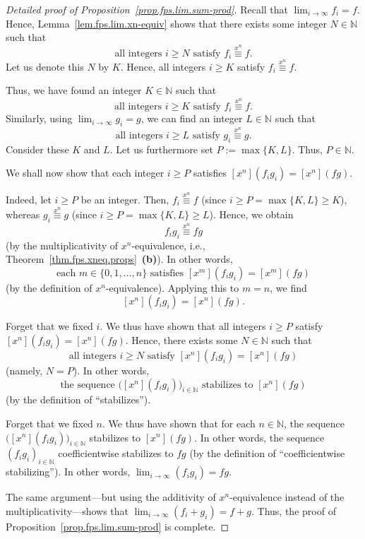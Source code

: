 \begin{proof}[Detailed proof of Proposition~\ref{prop.fps.lim.sum-prod}]
\leanok
Recall that $\lim_{i\to\infty} f_i = f$.
Hence, Lemma~\ref{lem.fps.lim.xn-equiv} shows that there exists some
integer $N\in\mathbb{N}$ such that
\[
\text{all integers } i\geq N \text{ satisfy }
f_i \overset{x^n}{\equiv} f.
\]
Let us denote this $N$ by $K$. Hence, all integers $i\geq K$ satisfy
$f_i \overset{x^n}{\equiv} f$.

Thus, we have found an integer $K\in\mathbb{N}$ such that
\[
\text{all integers } i\geq K \text{ satisfy }
f_i \overset{x^n}{\equiv} f.
\]
Similarly, using $\lim_{i\to\infty} g_i = g$, we can find an integer
$L\in\mathbb{N}$ such that
\[
\text{all integers } i\geq L \text{ satisfy }
g_i \overset{x^n}{\equiv} g.
\]
Consider these $K$ and $L$. Let us furthermore set
$P := \max\{K, L\}$. Thus, $P\in\mathbb{N}$.

We shall now show that each integer $i\geq P$ satisfies
$[x^n](f_i g_i) = [x^n](fg)$.

Indeed, let $i\geq P$ be an integer. Then, $f_i \overset{x^n}{\equiv} f$
(since $i\geq P = \max\{K, L\} \geq K$), whereas
$g_i \overset{x^n}{\equiv} g$
(since $i\geq P = \max\{K, L\} \geq L$). Hence, we obtain
\[
f_i g_i \overset{x^n}{\equiv} fg
\]
(by the multiplicativity of $x^n$-equivalence, i.e., Theorem~\ref{thm.fps.xneq.props}~\textbf{(b)}). In other words,
\[
\text{each } m\in\{0,1,\ldots,n\} \text{ satisfies }
[x^m](f_i g_i) = [x^m](fg)
\]
(by the definition of $x^n$-equivalence). Applying this to $m = n$,
we find
\[
[x^n](f_i g_i) = [x^n](fg).
\]

Forget that we fixed $i$. We thus have shown that all integers $i\geq P$
satisfy $[x^n](f_i g_i) = [x^n](fg)$. Hence, there exists some
$N\in\mathbb{N}$ such that
\[
\text{all integers } i\geq N \text{ satisfy }
[x^n](f_i g_i) = [x^n](fg)
\]
(namely, $N = P$). In other words,
\[
\text{the sequence } \bigl([x^n](f_i g_i)\bigr)_{i\in\mathbb{N}}
\text{ stabilizes to } [x^n](fg)
\]
(by the definition of ``stabilizes'').

Forget that we fixed $n$. We thus have shown that for each
$n\in\mathbb{N}$, the sequence $\bigl([x^n](f_i g_i)\bigr)_{i\in\mathbb{N}}$
stabilizes to $[x^n](fg)$. In other words, the sequence
$(f_i g_i)_{i\in\mathbb{N}}$ coefficientwise stabilizes to $fg$
(by the definition of ``coefficientwise stabilizing''). In other words,
$\lim_{i\to\infty}(f_i g_i) = fg$.

The same argument---but using the additivity of $x^n$-equivalence instead
of the multiplicativity---shows that
$\lim_{i\to\infty}(f_i + g_i) = f + g$. Thus, the proof of
Proposition~\ref{prop.fps.lim.sum-prod} is complete.
\end{proof}

